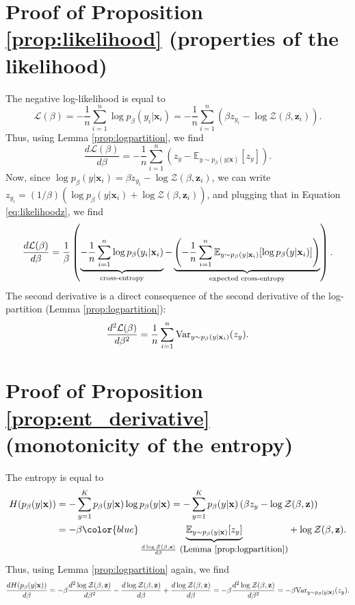\documentclass[10pt,dvipsnames]{article}
\newcommand{\bx}{\mathbf{x}}%
\newcommand{\bz}{\mathbf{z}}%
\theoremstyle{plain}
\theoremstyle{definition}
\theoremstyle{remark}
\begin{document}
\section{Proof of Proposition \ref{prop:likelihood} (properties of the likelihood)}
\label{app:likelihood}
The negative log-likelihood is equal to
\begin{equation}
    \mathcal{L}(\beta) =  -\frac{1}{n} \sum_{i=1}^n \log  p_{\beta} ( y_i | \bx_i) =  -\frac{1}{n} \sum_{i=1}^n \left( \beta z_{y_i} - \log \mathcal{Z}(\beta, \bz_i) \right).
\end{equation}
Thus, using Lemma \ref{prop:logpartition}, we find
\begin{equation}
\label{eq:likelihoodz}
    \frac{d\mathcal{L} (\beta) }{d \beta } =    -\frac{1}{n} \sum_{i=1}^n \left( z_y - \mathbb{E}_{y \sim p_\beta(y | \bx)} [ z_y ] \right).
\end{equation}
Now, since $\log p_\beta(y | \bx_i) = \beta z_{y_i} - \log \mathcal{Z}(\beta, \bz_i)$, we can write $ z_{y_i} = (1/\beta) (\log p_\beta(y | \bx_i) + \log \mathcal{Z}(\beta, \bz_i))$, and plugging that in Equation \eqref{eq:likelihoodz}, we find
\begin{equation}
 \frac{d \mathcal{L}(\beta)}{d\beta} =\frac{1}{\beta} \left( \underbrace{-\frac{1}{n} \sum_{i=1}^n  \log p_\beta (y_i | \bx_i)}_\textup{cross-entropy}    -  \underbrace{\left(-\frac{1}{n} \sum_{i=1}^n\mathbb{E}_{y \sim p_\beta(y | \bx_i)} [ \log p_\beta(y |\bx_i)]\right)} _\textup{expected cross-entropy}\right).
    \end{equation}    
The second derivative is a direct consequence of the second derivative of the log-partition (Lemma \ref{prop:logpartition}):
        \begin{equation}
        \frac{d^2 \mathcal{L} (\beta)}{d\beta^2}  = \frac{1}{n} \sum_{i=1}^n \textup{Var}_{y \sim p_\beta(y | \bx_i)} ( z_y ).
    \end{equation}   
\section{Proof of Proposition \ref{prop:ent_derivative} (monotonicity of the entropy)}
\label{app:monotonicity}
The entropy is equal to 
\begin{align}
    H(p_\beta(y | \bx)) &= -\sum_{y=1}^K p_\beta(y | \bx) \log p_\beta(y | \bx) =  -\sum_{y=1}^K p_\beta(y | \bx) \left( \beta z_y - \log \mathcal{Z}(\beta, \bz) \right) \\ &= - \beta {\color{blue}\underbrace{\mathbb{E}_{y \sim p_\beta(y | \bx)}[z_y]}_{\frac{d \log \mathcal{Z}(\beta, \bz)}{d\beta } \mbox{ \small (Lemma \ref{prop:logpartition})}}} +  \log \mathcal{Z}(\beta, \bz).
\end{align}
Thus, using Lemma \ref{prop:logpartition} again, we find
\begin{equation}
   \frac{d H(p_\beta(y | \bx))}{d\beta} = - \beta \frac{d^2 \log \mathcal{Z}(\beta, \bz)}{d\beta^2 } - \frac{d \log \mathcal{Z}(\beta, \bz)}{d\beta } + \frac{d \log \mathcal{Z}(\beta, \bz)}{d\beta } = - \beta \frac{d^2 \log \mathcal{Z}(\beta, \bz)}{d\beta^2 } = - \beta  \textup{Var}_{y \sim p_\beta(y | \bx)} ( z_y ).
\end{equation}
\end{document}
